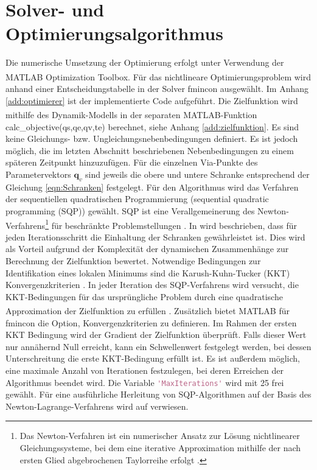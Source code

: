 \section{Solver- und Optimierungsalgorithmus}
Die numerische Umsetzung der Optimierung erfolgt unter Verwendung der MATLAB\textsuperscript{\textregistered} Optimization Toolbox\texttrademark. Für das nichtlineare Optimierungsproblem wird anhand einer Entscheidungstabelle in \cite[S.~80]{OptimizationToolbox.2023} der Solver fmincon ausgewählt.  Im Anhang \ref{add:optimierer} ist der implementierte Code aufgeführt. Die Zielfunktion wird mithilfe des Dynamik-Modells in der separaten MATLAB\textsuperscript{\textregistered}-Funktion calc\_objective(qs,qe,qv,te) berechnet, siehe Anhang \ref{add:zielfunktion}. Es sind keine Gleichungs- bzw. Ungleichungsnebenbedingungen definiert. Es ist jedoch möglich, die im letzten Abschnitt beschriebenen Nebenbedingungen zu einem späteren Zeitpunkt hinzuzufügen. Für die einzelnen Via-Punkte des Parametervektors $\bm{q}_{v}$ sind jeweils die obere und untere Schranke entsprechend der Gleichung \ref{eqn:Schranken} festgelegt. Für den Algorithmus wird das Verfahren der sequentiellen quadratischen Programmierung (sequential quadratic programming (SQP)) gewählt.  SQP ist eine Verallgemeinerung des Newton-Verfahrens\footnote{Das Newton-Verfahren ist ein numerischer Ansatz zur Lösung nichtlinearer Gleichungssysteme, bei dem eine iterative Approximation mithilfe der nach ersten Glied abgebrochenen Taylorreihe erfolgt \cite[S.~46]{Papageorgiou.2015}.} für beschränkte Problemstellungen \cite[S.~113]{Papageorgiou.2015}. In \cite[S.~253]{OptimizationToolbox.2023} wird beschrieben, dass für jeden Iterationsschritt die Einhaltung der Schranken gewährleistet ist. Dies wird als Vorteil aufgrund der Komplexität der dynamischen Zusammenhänge zur Berechnung der Zielfunktion  bewertet. Notwendige Bedingungen zur Identifikation eines lokalen Minimums sind die  Karush-Kuhn-Tucker (KKT) Konvergenzkriterien  \cite[S.~321]{Nocedal.2006}.  In jeder Iteration des SQP-Verfahrens wird versucht, die KKT-Bedingungen für das ursprüngliche Problem durch eine quadratische Approximation der Zielfunktion zu erfüllen \cite[S.~337~ff.]{Reinhardt.2013}. Zusätzlich bietet MATLAB\textsuperscript{\textregistered} für fmincon die Option, Konvergenzkriterien zu definieren. Im Rahmen der ersten KKT Bedingung wird der Gradient der Zielfunktion überprüft. Falls dieser Wert nur annähernd Null erreicht, kann ein Schwellenwert festgelegt werden, bei dessen Unterschreitung die erste KKT-Bedingung erfüllt ist. Es ist außerdem möglich, eine maximale Anzahl von Iterationen festzulegen, bei deren Erreichen der Algorithmus beendet wird. Die Variable \lstinline[language=Matlab]|'MaxIterations'| wird mit 25 frei gewählt.  Für eine ausführliche Herleitung von SQP-Algorithmen auf der Basis des Newton-Lagrange-Verfahrens wird auf \cite[S.~529~ff.]{Nocedal.2006} verwiesen.
%
